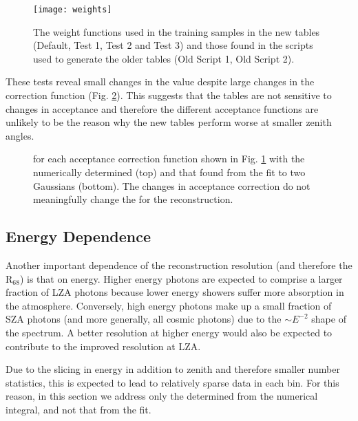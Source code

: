 \documentclass[main.tex]{subfiles}
\begin{document}
\begin{figure}[htbp]
  \centering
  \texttt{[image: weights]}
  \caption[Weight functions for offset from camera center.]{The weight functions used in the training samples in the new tables (Default, Test 1, Test 2 and Test 3) and those found in the scripts used to generate the older tables (Old Script 1, Old Script 2).}
  \label{fig:weights}
\end{figure}

These tests reveal small changes in the \rse value despite large changes in the correction function (Fig. \ref{fig:weight_tests}). This suggests that the \disp tables are not sensitive to changes in acceptance and therefore the different acceptance functions are unlikely to be the reason why the new \disp tables perform worse at smaller zenith angles.

\begin{figure}[H]
  \centering
  \caption[\rse for the acceptance correction functions.]{\rse for each acceptance correction function shown in Fig. \ref{fig:weights} with the numerically determined \rse (top) and that found from the fit to two Gaussians (bottom). The changes in acceptance correction do not meaningfully change the \rse for the reconstruction.}
  \label{fig:weight_tests}
\end{figure}

\subsection{Energy Dependence}
Another important dependence of the reconstruction resolution (and therefore the R$_{68}$) is that on energy. Higher energy photons are expected to comprise a larger fraction of LZA photons because lower energy showers suffer more absorption in the atmosphere. Conversely, high energy photons make up a small fraction of SZA photons (and more generally, all cosmic photons) due to the $\sim E^{-2}$ shape of the spectrum. A better resolution at higher energy would also be expected to contribute to the improved resolution at LZA.

Due to the slicing in energy in addition to zenith and therefore smaller number statistics, this is expected to lead to relatively sparse data in each bin. For this reason, in this section we address only the \rse determined from the numerical integral, and not that from the fit.
\end{document}

